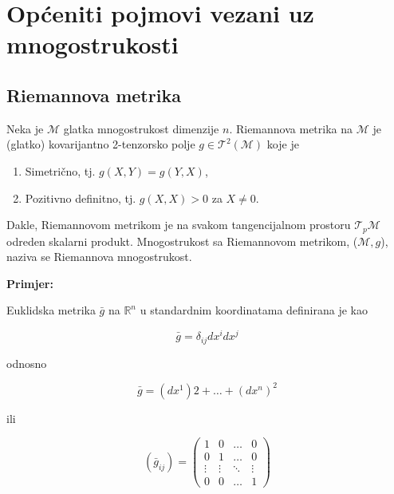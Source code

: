 \chapter{Općeniti pojmovi vezani uz mnogostrukosti}\label{cha:Appmnogo}

\section{Riemannova metrika}

Neka je $\mathcal{M}$ glatka mnogostrukost dimenzije $n$. Riemannova metrika na $\mathcal{M}$ je (glatko) kovarijantno 2-tenzorsko polje $g\in\mathcal{T}^2(\mathcal{M})$ koje je

\begin{enumerate}
\itemsep-2em 
\item Simetrično, tj. $g(X,Y)=g(Y,X)$,\\
\item Pozitivno definitno, tj. $g(X,X)>0$ za $X\neq 0$.
\end{enumerate}

\noindent Dakle, Riemannovom metrikom je na svakom tangencijalnom prostoru $\mathcal{T}_p\mathcal{M}$ odreden skalarni produkt. Mnogostrukost sa Riemannovom metrikom, ($\mathcal{M},g$), naziva se Riemannova mnogostrukost.

\newpage 

\noindent \textbf{Primjer:}

\noindent Euklidska metrika $\bar{g}$ na $\mathbb{R}^n$ u standardnim koordinatama definirana je kao

\begin{equation}
\bar{g}=\delta_{ij}dx^i dx^j
\end{equation}

\noindent odnosno

\begin{equation}
\bar{g}=(dx^1)2+\ldots+(dx^n)^2
\end{equation}

\noindent ili

\begin{equation}
(\bar{g}_{ij})=\begin{pmatrix}
1 & 0 & \ldots & 0 \\
0 & 1 & \ldots & 0 \\
\vdots & \vdots & \ddots & \vdots \\
0 & 0 & \ldots & 1
\end{pmatrix}
\end{equation}

